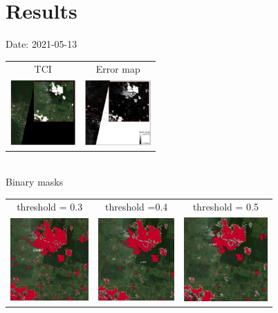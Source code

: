 \documentclass{beamer}
\begin{document}
\section{Results}
\begin{frame}{Date: 2021-05-13}
\centering
    \begin{tabular}{cc}
    TCI & Error map\\
    \includegraphics[width=2.5cm]{Figures/v3/20210513/111-TCI_with_zoom_roi.pdf}
    &
    \includegraphics[width=2.5cm]{Figures/v3/20210513/222-error_map_with_zoom_roi.pdf}
\end{tabular}
\\
   \centering
    Binary masks
    \begin{tabular}{ccc}
    threshold = 0.3  & threshold =0.4 &  threshold = 0.5 \\
    \includegraphics[width=3cm]{Figures/v3/20210513/binary_mask_umbral_03/zoom1.png}
    &
    \includegraphics[width=2.9cm]{Figures/v3/20210513/binary_mask_umbral_04/zoom1.png}
    &
    \includegraphics[width=3.2cm]{Figures/v3/20210513/binary_mask_umbral_05/33-binary_mask_zoom.png}
    \end{tabular}
\end{frame}
\end{document}
